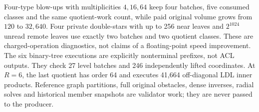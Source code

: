 Four-type blow-ups with multiplicities $4,16,64$ keep four batches,
five consumed classes and the same quotient-work count, while paid
original volume grows from $120$ to $32,640$. Four private double-stars
with up to 256 near leaves and $2^{1024}$ unread remote leaves use exactly
two batches and two quotient classes. These are charged-operation
diagnostics, not claims of a floating-point speed improvement.
The six binary-tree executions are explicitly nonterminal prefixes,
not ACL outputs. They check 27 level batches and 246 independently lifted
coordinates. At $R=6$, the last quotient has order 64 and executes 41,664
off-diagonal LDL inner products. Reference graph partitions, full original
obstacles, dense inverses, radial solves and historical member snapshots
are validator work; they are never passed to the producer.
